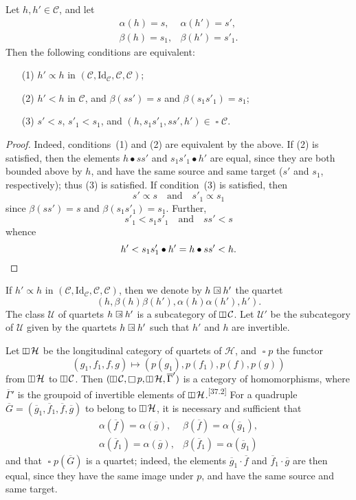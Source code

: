 \documentclass[a4paper,fleqn]{article}
\makeatletter
\theoremstyle{plain}
\newenvironment{proposition}[1]
  {\renewcommand\theinnerproposition{#1}\innerproposition}
  {\endinnerproposition}
\theoremstyle{definition}
\def\blfootnote{\xdef\@thefnmark{}\@footnotetext}
\newcommand{\comm}[2]{{\normalfont\textsuperscript{[#1]}}\blfootnote{\label{footnote:#1}\textbf{[#1]} #2}}
\newcommand{\textand}{\quad\text{and}\quad}
\newcommand{\CC}{\mathcal{C}}
\newcommand{\HH}{\mathcal{H}}
\newcommand{\UU}{\mathcal{U}}
\newcommand{\subs}{\mathrel{\propto}}
\newcommand{\Id}{\mathrm{Id}}
\newcommand{\vsqbox}{{\rotatebox{90}{$\boxminus$}}}
\DeclareMathOperator{\sq}{\square}
\DeclareMathOperator{\vsq}{\raisebox{-.1em}{$\vsqbox$}}
\newcommand{\sqsubs}{\mathrel{\mathrlap{\square}\raisebox{.17em}{\scaleobj{0.65}{\,\,\propto}}}}
\makeatother
\begin{document}
\begin{proposition}{8}
\label{proposition:i-8}
  Let $h,h'\in\CC$, and let
  \[
    \begin{array}{ll}
      \alpha(h)
      = s,
      &\alpha(h')
      = s',
    \\\beta(h)
      = s_1,
      &\beta(h')
      = s'_1.
    \end{array}
  \]
  Then the following conditions are equivalent:
  \begin{enumerate}
    \item[\normalfont(1)]
      $h'\subs h$ in $(\CC,\Id_\CC,\CC,\CC)$;
    \item[\normalfont(2)]
      $h'<h$ in $\CC$, and $\beta(ss')=s$ and $\beta(s_1s'_1)=s_1$;
    \item[\normalfont(3)]
      $s'<s$, $s'_1<s_1$, and $(h,s_1s'_1,ss',h')\in\sq\CC$.
  \end{enumerate}
\end{proposition}

\begin{proof}
  Indeed, conditions~(1) and (2) are equivalent by the above.
  If (2) is satisfied, then the elements $h\bullet ss'$ and $s_1s'_1\bullet h'$ are equal, since they are both bounded above by $h$, and have the same source and same target ($s'$ and $s_1$, respectively);
  thus (3) is satisfied.
  If condition~(3) is satisfied, then
  \[
    s'\subs s
    \textand
    s'_1\subs s_1
  \]
  since $\beta(ss')=s$ and $\beta(s_1s'_1)=s_1$.
  Further,
  \[
    s'_1<s_1s'_1
    \textand
    ss'<s
  \]
  whence
  \[
    h'
    < s_1s'_1\bullet h'
    = h\bullet ss'
    < h.
    \qedhere
  \]
\end{proof}

If $h'\subs h$ in $(\CC,\Id_\CC,\CC,\CC)$, then we denote by $h\sqsubs h'$ the quartet
\[
  (h,\beta(h)\beta(h'),\alpha(h)\alpha(h'),h').
\]
The class $\UU$ of quartets $h\sqsubs h'$ is a subcategory of $\vsq\CC$.
Let $\UU'$ be the subcategory of $\UU$ given by the quartets $h\sqsubs h'$ such that $h'$ and $h$ are invertible.

Let $\vsq\HH$ be the longitudinal category of quartets of $\HH$, and $\sq p$ the functor
\[
  (g_1,f_1,f,g)
  \longmapsto (p(g_1),p(f_1),p(f),p(g))
\]
from $\vsq\HH$ to $\vsq\CC$.
Then $(\vsq\CC,\sq p,\vsq\HH,\overline{\Gamma}')$ is a category of homomorphisms, where $\overline{\Gamma}'$ is the groupoid of invertible elements of $\vsq\HH$.\comm{37.2}{This is easy to prove (cf. \cite[Chapter~II]{coll122}).}
For a quadruple $\overline{G}=(\overline{g}_1,\overline{f}_1,\overline{f},\overline{g})$ to belong to $\vsq\HH$, it is necessary and sufficient that
\[
  \begin{array}{ll}
    \alpha(\overline{f})=\alpha(\overline{g}),
    & \beta(\overline{f})=\alpha(\overline{g}_1),
  \\\alpha(\overline{f}_1)=\alpha(\overline{g}),
    & \beta(\overline{f}_1)=\alpha(\overline{g}_1)
  \end{array}
\]
and that $\sq p(\overline{G})$ is a quartet;
indeed, the elements $\overline{g}_1\cdot\overline{f}$ and $\overline{f}_1\cdot\overline{g}$ are then equal, since they have the same image under $p$, and have the same source and same target.
\end{document}
